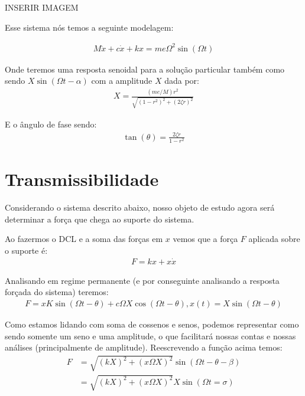 \documentclass{article}
\newcommand{\n}{\nonumber \\ }
\begin{document}
            INSERIR IMAGEM 

            Esse sistema nós temos a seguinte modelagem:

            \begin{align}
                M\ddot x + c \dot x + kx = me\Omega^2 \sin(\Omega t)
            \end{align}

            Onde teremos uma resposta senoidal para a solução particular também como sendo $X \sin{(\Omega t - \alpha)}$ com a amplitude $X$ dada por:
            \begin{align}
                X = \frac{(me/M) r^2}{\sqrt{(1-r^2)^2 + (2\zeta r)^2}}
            \end{align}

            E o ângulo de fase sendo:
            \begin{align}
                \tan{(\theta)} = \frac{2\zeta r}{ 1 - r^2}
            \end{align}

        \section{Transmissibilidade}
            Considerando o sistema descrito abaixo, nosso objeto de estudo agora será determinar a força que chega ao suporte do sistema.

            Ao fazermos o DCL e  a soma das forças em $x$ vemos que a força $F$ aplicada sobre o suporte é:
            \begin{align}
                F = kx + x\dot x
            \end{align}

            Analisando em regime permanente (e por conseguinte analisando a resposta forçada do sistema) teremos:
            \begin{align}
                F = xK\sin(\Omega t - \theta) + c \Omega X \cos(\Omega t - \theta) ,   x(t) = X\sin(\Omega t -\theta)
            \end{align}

            Como estamos lidando com soma de cossenos e senos, podemos representar como sendo somente um seno e uma amplitude, o que facilitará nossas contas e nossas análises (principalmente de
            amplitude). Reescrevendo a função acima temos:
            \begin{align}
                F &= \sqrt{(kX)^2 + (x\Omega X)^2} \sin(\Omega t - \theta - \beta) \n
                  &= \sqrt{(kX)^2 + (x\Omega X)^2}  X \sin(\Omega t = \sigma)
            \end{align}
\end{document}
